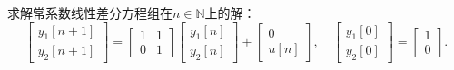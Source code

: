 \begin{example}
    求解常系数线性差分方程组在$n\in\mathbb{N}$上的解：
    \begin{equation}
        \begin{bmatrix}
            y_1[n+1] \\
            y_2[n+1]
        \end{bmatrix}=\begin{bmatrix}
            1 & 1 \\
            0 & 1
        \end{bmatrix}
        \begin{bmatrix}
            y_1[n] \\
            y_2[n]
        \end{bmatrix}+\begin{bmatrix}
            0 \\
            u[n]
        \end{bmatrix},\quad
        \begin{bmatrix}
            y_1[0] \\
            y_2[0]
        \end{bmatrix}=\begin{bmatrix}
            1 \\
            0
        \end{bmatrix}.
    \end{equation}


\end{example}
